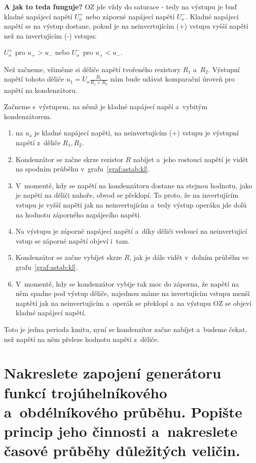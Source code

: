 \documentclass[a4paper,12pt]{article}   %
\begin{document}
\textbf{A jak to teda funguje?} OZ jde vždy do saturace - tedy na výstupu je buď kladné napájecí napětí $U_o^+$ nebo záporné napájecí napětí $U_o^-$. Kladné napájecí napětí se na výstup dostane, pokud je na neinvertujícím (+) vstupu vyšší napětí než na invertujícím (-) vstupu: 

\begin{center}
    $U_o^+$ pro $u_+ > u_-$ nebo $U_o^-$ pro $u_+ < u_-$.
\end{center}

Než začneme, všiměme si děliče napětí tvořeného rezistory $R_1$ a~$R_2$. Výstupní napětí tohoto děliče $u_1 = U_o \frac{R_1}{R_1 + R_2}$ nám bude udávat komparační úroveň pro napětí na kondenzátoru.

Začneme s~výstupem, na němž je kladné napájecí napěí a~vybitým kondenzátorem.

\begin{enumerate}
    \item na $u_o$ je kladné napájecí napětí, na neinvertujícím (+) vstupu je výstupní napětí z~děliče $R_1, R_2$.
    \item Kondenzátor se začne skrze rezistor $R$ nabíjet a~jeho rostoucí napětí je vidět na spodním průběhu v~grafu~\ref{graf:astab:kl}.
    \item V~momentě, kdy se napětí na kondenzátoru dostane na stejnou hodnotu, jako je napětí na děliči nahoře, obvod se překlopí. To proto, že na invertujícím vstupu je vyšší napětí jak na neinvertujícím a~tedy výstup operáku jde dolů na hodnotu záporného napájecího napětí.
    \item Na výstupu je záporné napájecí napětí a~díky děliči vedoucí na neinvertující vstup se záporné napětí objeví i~tam.
    \item Kondenzátor se začne vybíjet skrze $R$, jak je dále vidět v~dolním průběhu ve grafu~\ref{graf:astab:kl}.
    \item V~momentě, kdy se kondenzátor vybije tak moc do záporna, že napětí na něm spadne pod výstup děliče, najednou máme na invertujícím vstupu menší naptětí jak na neinvertujícím a~operák se překlopí a~na výstupu OZ se objeví kladné napájecí napětí.
\end{enumerate}
Toto je jedna perioda kmitu, nyní se kondenzítor začne nabíjet a~budeme čekat, než napětí na něm přeleze hodnotu napětí z~děliče.






\section{Nakreslete zapojení generátoru funkcí {trojúhelníkového a~obdélníkového průběhu}. Popište princip jeho činnosti a~nakreslete časové průběhy důležitých veličin.}
\end{document}

